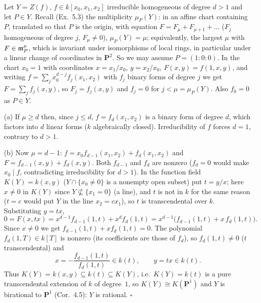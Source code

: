 \documentclass[11pt]{article}
\begin{document}
\pf
Let $Y=Z(f)$, $f\in k[x_0,x_1,x_2]$ irreducible homogeneous of degree $d>1$ and let $P\in Y$. Recall (Ex.~5.3) the multiplicity $\mu_P(Y)$: in an affine chart containing $P$, translated so that $P$ is the origin, with equation $F=F_\mu+F_{\mu+1}+\dots$ ($F_j$ homogeneous of degree $j$, $F_\mu\ne0$), $\mu_P(Y)=\mu$; equivalently, the largest $\mu$ with $F\in\mathfrak m_P^\mu$, which is invariant under isomorphisms of local rings, in particular under a linear change of coordinates in $\mathbf P^2$. So we may assume $P=(1:0:0)$. In the chart $x_0=1$ with coordinates $x=x_1/x_0$, $y=x_2/x_0$, $F(x,y)=f(1,x,y)$, and writing $f=\sum_{j}x_0^{d-j}f_j(x_1,x_2)$ with $f_j$ binary forms of degree $j$ we get $F=\sum_jf_j(x,y)$, so $F_j=f_j(x,y)$ and $f_j=0$ for $j<\mu=\mu_P(Y)$. Also $f_0=0$ as $P\in Y$.

(a) If $\mu\ge d$ then, since $j\le d$, $f=f_d(x_1,x_2)$ is a binary form of degree $d$, which factors into $d$ linear forms ($k$ algebraically closed). Irreducibility of $f$ forces $d=1$, contrary to $d>1$.

(b) Now $\mu=d-1$: $f=x_0f_{d-1}(x_1,x_2)+f_d(x_1,x_2)$ and $F=f_{d-1}(x,y)+f_d(x,y)$. Both $f_{d-1}$ and $f_d$ are nonzero ($f_d=0$ would make $x_0\mid f$, contradicting irreducibility for $d>1$). In the function field $K(Y)=k(x,y)$ ($Y\cap\{x_0\ne0\}$ is a nonempty open subset) put $t=y/x$; here $x\ne0$ in $K(Y)$ since $Y\not\subseteq\{x_1=0\}$ (a line), and $t$ is not in $k$ for the same reason ($t=c$ would put $Y$ in the line $x_2=cx_1$), so $t$ is transcendental over $k$. Substituting $y=tx$,
\[
0=F(x,tx)=x^{d-1}f_{d-1}(1,t)+x^df_d(1,t)=x^{d-1}\big(f_{d-1}(1,t)+x\,f_d(1,t)\big).
\]
Since $x\ne0$ we get $f_{d-1}(1,t)+xf_d(1,t)=0$. The polynomial $f_d(1,T)\in k[T]$ is nonzero (its coefficients are those of $f_d$), so $f_d(1,t)\ne0$ ($t$ transcendental) and
\[
x=-\frac{f_{d-1}(1,t)}{f_d(1,t)}\in k(t),\qquad y=tx\in k(t).
\]
Thus $K(Y)=k(x,y)\subseteq k(t)\subseteq K(Y)$, i.e.\ $K(Y)=k(t)$ is a pure transcendental extension of $k$ of degree~$1$, so $K(Y)\cong K(\mathbf P^1)$ and $Y$ is birational to $\mathbf P^1$ (Cor.~4.5): $Y$ is rational. \hfill$\square$
\end{document}
